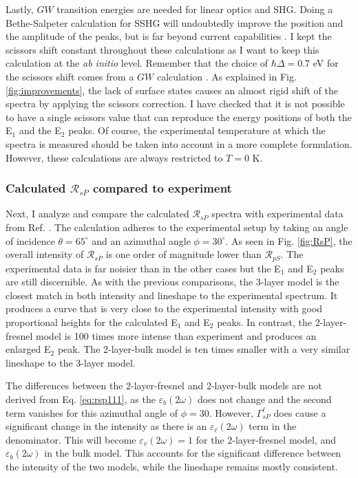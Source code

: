 Lastly, $GW$ transition energies are needed for linear optics and SHG. Doing a Bethe-Salpeter calculation for SSHG will undoubtedly improve the position and the amplitude of the peaks, but is far beyond current capabilities \cite{puff}. I kept the scissors shift constant throughout these calculations as I want to keep this calculation at the {\em ab initio} level. Remember that the choice of $\hbar\Delta=0.7$ eV for the scissors shift comes from a $GW$ calculation \cite{liPRB10}. As explained in Fig. \ref{fig:improvements}, the lack of surface states causes an almost rigid shift of the spectra by applying the scissors correction. I have checked that it is not possible to have a single scissors value that can reproduce the energy positions of both the E$_{1}$ and the E$_{2}$ peaks. Of course, the experimental temperature at which the spectra is measured should be taken into account in a more complete formulation. However, these calculations are always restricted to $T=0$ K.



\subsubsection{Calculated \texorpdfstring{$\mathcal{R}_{sP}$}{RsP} compared to 
experiment}\label{sec:1x1RsP}

Next, I analyze and compare the calculated $\mathcal{R}_{sP}$ spectra with experimental data from Ref. \cite{mejiaPRB02}. The calculation adheres to the experimental setup by taking an angle of incidence $\theta=65^{\circ}$ and an azimuthal angle $\phi=30^\circ$. As seen in Fig. \ref{fig:RsP}, the overall intensity of $\mathcal{R}_{sP}$ is one order of magnitude lower than $\mathcal{R}_{pS}$. The experimental data is far noisier than in the other cases but the E$_{1}$ and E$_{2}$ peaks are still discernible. As with the previous comparisons, the 3-layer model is the closest match in both intensity and lineshape to the experimental spectrum. It produces a curve that is very close to the experimental intensity with good proportional heights for the calculated E$_{1}$ and E$_{2}$ peaks. In contrast, the 2-layer-fresnel model is 100 times more intense than experiment and produces an enlarged E$_{2}$ peak. The 2-layer-bulk model is ten times smaller with a very similar lineshape to the 3-layer model.

The differences between the 2-layer-fresnel and 2-layer-bulk models are not derived from Eq. \eqref{eq:rsp111}, as the $\varepsilon_{b}(2\omega)$ does not change and the second term vanishes for this azimuthal angle of $\phi = 30$. However, $\Gamma^{\ell}_{sP}$ does cause a significant change in the intensity as there is an $\varepsilon_{\ell}(2\omega)$ term in the denominator. This will become $\varepsilon_{v}(2\omega) = 1$ for the 2-layer-fresnel model, and $\varepsilon_{b}(2\omega)$ in the bulk model. This accounts for the significant difference between the intensity of the two models, while the lineshape remains mostly consistent.

